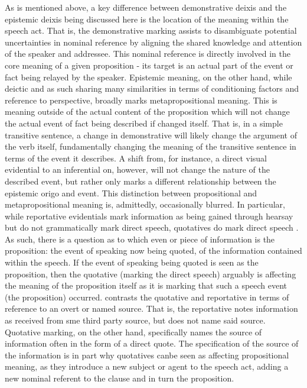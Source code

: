 As is mentioned above, a key difference between demonstrative deixis and the epistemic deixis being discussed here is the location of the meaning within the speech act. That is, the demonstrative marking assists to disambiguate potential uncertainties in nominal reference by aligning the shared knowledge and attention of the speaker and addressee. This nominal reference is directly involved in the core meaning of a given proposition - its target is an actual part of the event or fact being relayed by the speaker. Epistemic meaning, on the other hand, while deictic and as such sharing many similarities in terms of conditioning factors and reference to perspective, broadly marks metapropositional meaning. This is meaning outside of the actual content of the proposition which will not change the actual event of fact being described if changed itself. That is, in a simple transitive sentence, a change in demonstrative will likely change the argument of the verb itself, fundamentally changing the meaning of the transitive sentence in terms of the event it describes. A shift from, for instance, a direct visual evidential to an inferential on, however, will not change the nature of the described event, but rather only marks a different relationship between the epistemic origo and event. This distinction between propositional and metapropositional meaning is, admittedly, occasionally blurred. In particular, while reportative evidentials mark information as being gained through hearsay but do not grammatically mark direct speech, quotatives do mark direct speech . As such, there is a question as to which even or piece of information is the proposition: the event of speaking now being quoted, of the information contained within the speech. If the event of speaking being quoted is seen as the proposition, then the quotative (marking the direct speech) arguably is affecting the meaning of the proposition itself as it is marking that such a speech event (the proposition) occurred.  contrasts the quotative and reportative in terms of reference to an overt or named source. That is, the reportative notes information as received from sme third party source, but does not name said source. Quotative marking, on the other hand, specifically names the source of information often in the form of a direct quote. The specification of the source of the information is in part why quotatives canbe seen as affecting propositional meaning, as they introduce a new subject or agent to the speech act, adding a new nominal referent to the clause and in turn the proposition. 

